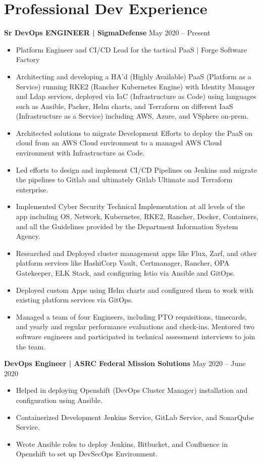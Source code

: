 \documentclass[letterpaper, 10pt]{article}
\begin{document}
\section*{Professional Dev Experience}
\textbf{Sr DevOps ENGINEER | SigmaDefense} \hfill May 2020 – Present
\begin{itemize}
    \item Platform Engineer and CI/CD Lead for the tactical PaaS | Forge Software Factory
    \item Architecting and developing a HA'd (Highly Available) PaaS (Platform as a Service) running RKE2 (Rancher Kubernetes Engine) with Identity Manager and Ldap services, deployed via IaC (Infrastructure as Code) using languages such as Ansible, Packer, Helm charts, and Terraform on different IaaS (Infrastructure as a Service) including AWS, Azure, and VSphere on-prem.
    \item Architected solutions to migrate Development Efforts to deploy the PaaS on cloud from an AWS Cloud environment to a managed AWS Cloud environment with Infrastructure as Code.
    \item Led efforts to design and implement CI/CD Pipelines on Jenkins and migrate the pipelines to Gitlab and ultimately Gitlab Ultimate and Terraform enterprise.
    \item Implemented Cyber Security Technical Implementation at all levels of the app including OS, Network, Kubernetes, RKE2, Rancher, Docker, Containers, and all the Guidelines provided by the Department Information System Agency.
    \item Researched and Deployed cluster management apps like Flux, Zarf, and other platform services like HashiCorp Vault, Certmanager, Rancher, OPA Gatekeeper, ELK Stack, and configuring Istio via Ansible and GitOps.
    \item Deployed custom Apps using Helm charts and configured them to work with existing platform services via GitOps.
    \item Managed a team of four Engineers, including PTO requisitions, timecards, and yearly and regular performance evaluations and check-ins. Mentored two software engineers and participated in technical assessment interviews to join the team.
\end{itemize}

\textbf{DevOps Engineer | ASRC Federal Mission Solutions} \hfill May 2020 – June 2020
\begin{itemize}
    \item Helped in deploying Openshift (DevOps Cluster Manager) installation and configuration using Ansible.
    \item Containerized Development Jenkins Service, GitLab Service, and SonarQube Service.
    \item Wrote Ansible roles to deploy Jenkins, Bitbucket, and Confluence in Openshift to set up DevSecOps Environment.
\end{itemize}
\end{document}
